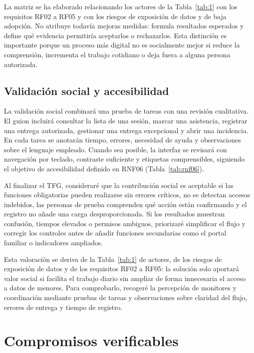 La matriz se ha elaborado relacionando los actores de la Tabla~\ref{tab:1} con los requisitos RF02 a RF05 y con los riesgos de exposición de datos y de baja adopción. No atribuye todavía mejoras medidas: formula resultados esperados y define qué evidencia permitiría aceptarlos o rechazarlos. Esta distinción es importante porque un proceso más digital no es socialmente mejor si reduce la comprensión, incrementa el trabajo cotidiano o deja fuera a alguna persona autorizada.

\subsection{Validación social y accesibilidad}\label{sec:sost-5-2}

La validación social combinará una prueba de tareas con una revisión cualitativa. El guion incluirá consultar la lista de una sesión, marcar una asistencia, registrar una entrega autorizada, gestionar una entrega excepcional y abrir una incidencia. En cada tarea se anotarán tiempo, errores, necesidad de ayuda y observaciones sobre el lenguaje empleado. Cuando sea posible, la interfaz se revisará con navegación por teclado, contraste suficiente y etiquetas comprensibles, siguiendo el objetivo de accesibilidad definido en RNF06 (Tabla~\ref{tab:rnf06}).

Al finalizar el TFG, consideraré que la contribución social es aceptable si las funciones obligatorias pueden realizarse sin errores críticos, no se detectan accesos indebidos, las personas de prueba comprenden qué acción están confirmando y el registro no añade una carga desproporcionada. Si los resultados muestran confusión, tiempos elevados o permisos ambiguos, priorizaré simplificar el flujo y corregir los controles antes de añadir funciones secundarias como el portal familiar o indicadores ampliados.

Esta valoración se deriva de la Tabla~\ref{tab:1} de actores, de los riesgos de exposición de datos y de los requisitos RF02 a RF05: la solución solo aportará valor social si facilita el trabajo diario sin ampliar de forma innecesaria el acceso a datos de menores. Para comprobarlo, recogeré la percepción de monitores y coordinación mediante pruebas de tareas y observaciones sobre claridad del flujo, errores de entrega y tiempo de registro.

\section{Compromisos verificables}\label{sec:sost-6}

